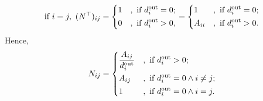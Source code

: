 \begin{enumerate}[(a)]
\[\begin{alignedat}{3}
			      &\text{if }i = j,\ (N^{\top})_{ij} = \begin{dcases}
				      1 & , \text{ if } d_{i}^{\text{out}} = 0; \\
				      0 & , \text{ if } d_{i}^{\text{out}} > 0, \\
			      \end{dcases} &&= \begin{dcases}
				      1      & , \text{ if } d_{i}^{\text{out}} = 0; \\
				      A_{ii} & , \text{ if } d_{i}^{\text{out}} > 0. \\
			      \end{dcases}
		      \end{alignedat}
	      \]
	      Hence,
	      \[
		      N_{ij} = \begin{dcases}
			      \frac{A_{ij}}{d_{i}^{\text{out}}} & , \text{ if } d_{i}^{\text{out}} > 0;              \\
			      A_{ij}                            & , \text{ if }d_{i}^{\text{out}} = 0 \land i\neq j; \\
			      1                                 & , \text{ if }d_{i}^{\text{out}} = 0 \land i= j.    \\
		      \end{dcases}
	      \]
\end{enumerate}

